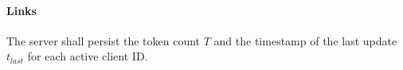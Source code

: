\label{SR-102}
\paragraph{Links} 

The server shall persist the token count $T$ and the timestamp of the last update $t_{last}$ for each active client ID\@.

